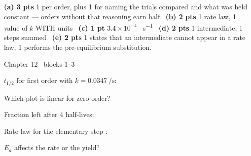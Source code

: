 \documentclass{apchem-worksheet}
\begin{document}
\begin{apcnote}
\textbf{(a) 3 pts} 1 per order, plus 1 for naming the trials compared and
what was held constant --- orders without that reasoning earn half
\textbullet\ \textbf{(b) 2 pts} 1 rate law, 1 value of $k$ WITH units
\textbullet\ \textbf{(c) 1 pt} $3.4\times10^{-4}$ \si{\Molar\per\second}
\textbullet\ \textbf{(d) 2 pts} 1 intermediate, 1 steps summed
\textbullet\ \textbf{(e) 2 pts} 1 states that an intermediate cannot appear
in a rate law, 1 performs the pre-equilibrium substitution.
\end{apcnote}

\begin{spiralstrip}{Chapter 12 \textbullet\ blocks 1--3}
  \item $t_{1/2}$ for first order with $k = \SI{0.0347}{\per\second}$:
  \item Which plot is linear for zero order?
  \item Fraction left after 4 half-lives: 
  \item Rate law for the elementary step :
  \item $E_a$ affects the rate or the yield? 
\end{spiralstrip}
\end{document}
